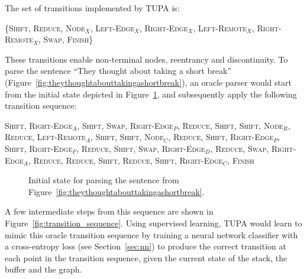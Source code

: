 \documentclass[12pt,a4paper,table]{report}
\begin{document}
The set of transitions implemented by TUPA is:

\{\textsc{Shift, Reduce, {Node$_X$}, Left-Edge$_X$, Right-Edge$_X$,}
\textsc{{Left-Remote$_X$}, {Right-Remote$_X$}, {Swap}, Finish}\}

These transitions enable {non-terminal nodes}, {reentrancy} and {discontinuity}.
To parse the sentence ``They thought about taking a short break'' (Figure~\ref{fig:theythoughtabouttakingashortbreak}),
an oracle parser would start from the initial state depicted in Figure~\ref{fig:initial_state},
and subsequently apply the following transition sequence:

\textsc{Shift}, \textsc{Right-Edge$_A$}, \textsc{Shift}, \textsc{Swap}, \textsc{Right-Edge$_P$}, \textsc{Reduce}, \textsc{Shift}, \textsc{Shift}, \textsc{Node$_R$}, \textsc{Reduce}, \textsc{Left-Remote$_A$}, \textsc{Shift}, \textsc{Shift}, \textsc{Node$_C$}, \textsc{Reduce}, \textsc{Shift}, \textsc{Right-Edge$_P$}, \textsc{Shift}, \textsc{Right-Edge$_F$}, \textsc{Reduce}, \textsc{Shift}, \textsc{Swap}, \textsc{Right-Edge$_D$}, \textsc{Reduce}, \textsc{Swap}, \textsc{Right-Edge$_A$}, \textsc{Reduce}, \textsc{Reduce}, \textsc{Shift}, \textsc{Reduce}, \textsc{Shift}, \textsc{Right-Edge$_C$}, \textsc{Finish}

\begin{figure}\centering
{}
\caption{Initial state for parsing the sentence from Figure~\ref{fig:theythoughtabouttakingashortbreak}.}
\label{fig:initial_state}
\end{figure}

A few intermediate steps from this sequence are shown in Figure~\ref{fig:transition_sequence}.
Using supervised learning, TUPA would learn to mimic this oracle transition sequence
by training a neural network classifier with a cross-entropy loss
(see Section~\ref{sec:nn})
to produce the correct transition at each point in the transition sequence,
given the current state of the stack, the buffer and the graph.
\end{document}
